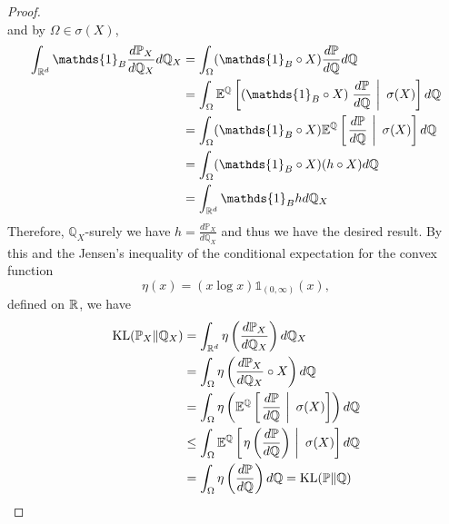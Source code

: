 \documentclass[a4paper,12pt]{article}
\begin{document}
\begin{enumerate}[label=(\arabic*)]
\begin{rmk}
\begin{proof}
\begin{equation*}
      \end{equation*}
      and by $\Omega \in \sigma(X)$,
      \begin{equation*}
        \begin{aligned}
          \int_{\R^d}\mathds{1}_B\frac{d\mathbb{P}_X}{d\mathbb{Q}_X} d\mathbb{Q}_X &= \int_\Omega (\mathds{1}_B \circ X) \frac{d\mathbb{P}}{d\mathbb{Q}}d\mathbb{Q} \\
          &= \int_\Omega \E^{\mathbb{Q}}\bj{ (\mathds{1}_B \circ X)\lv{\frac{d\mathbb{P}}{d\mathbb{Q}}~}~\sigma(X)}d\mathbb{Q} \\
          &= \int_\Omega (\mathds{1}_B \circ X) \E^{\mathbb{Q}}\bj{ \lv{\frac{d\mathbb{P}}{d\mathbb{Q}}~}~\sigma(X)}d\mathbb{Q} \\
          &= \int_\Omega (\mathds{1}_B \circ X) (h \circ X)d\mathbb{Q} \\
          &= \int_{\R^d} \mathds{1}_Bh d\mathbb{Q}_X
        \end{aligned}
      \end{equation*}
      Therefore, $\mathbb{Q}_X$-surely we have $h = \frac{d\mathbb{P}_X}{d\mathbb{Q}_X}$ and thus we have the desired result. By this and the Jensen's inequality of the conditional expectation for the convex function
      \begin{equation*}
        \eta(x) = (x\log x)\mathds{1}_{(0,\infty)}(x),
      \end{equation*}
      defined on $\mathbb{R}$, we have
      \begin{equation*}
        \begin{aligned}
          \text{KL}(\mathbb{P}_X\Vert\mathbb{Q}_X) &= \int_{\mathbb{R}^d} \eta\left(\frac{d\mathbb{P}_X}{d\mathbb{Q}_X}\right)d\mathbb{Q}_X \\
          &= \int_{\Omega} \eta\left(\frac{d\mathbb{P}_X}{d\mathbb{Q}_X} \circ X\right)d\mathbb{Q} \\
          &= \int_{\Omega} \eta\left(\mathbb{E}^{\mathbb{Q}}\left[ \left.\frac{d\mathbb{P}}{d\mathbb{Q}}~\right\lvert~\sigma(X)\right]\right)d\mathbb{Q} \\
          &\leq \int_{\Omega} \mathbb{E}^{\mathbb{Q}}\left[ \left.\eta\left(\frac{d\mathbb{P}}{d\mathbb{Q}}\right)~\right\lvert~\sigma(X)\right]d\mathbb{Q} \\
          &= \int_{\Omega} \eta\left(\frac{d\mathbb{P}}{d\mathbb{Q}}\right)d\mathbb{Q} = \text{KL}(\mathbb{P}\Vert\mathbb{Q})
        \end{aligned}
      \end{equation*}
    \end{proof}
  \end{rmk}


\end{enumerate}
\end{document}
